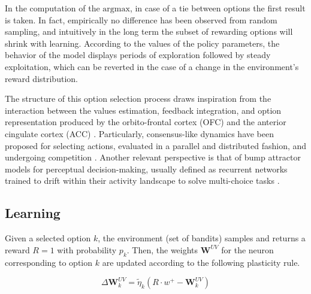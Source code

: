\noindent In the computation of the $\text{argmax}$, in case of a tie between options the first result is taken.
In fact, empirically no difference has been observed from random sampling, and intuitively in the long term the subset of rewarding options will shrink with learning.
According to the values of the policy parameters, the behavior of the model displays periods of exploration followed by steady exploitation, which can be reverted in the case of a change in the environment's reward distribution.

The structure of this option selection process draws inspiration from the interaction between the values estimation, feedback integration, and option representation produced by the orbito-frontal cortex (OFC) and the anterior cingulate cortex (ACC) \cite{kennerleyDecisionMakingReward2011, lukChoiceCodingFrontal2013, rollsEmotionMotivationDecisionmaking2023}.
Particularly, consensus-like dynamics have been proposed for selecting actions, evaluated in a parallel and distributed fashion, and undergoing competition \cite{cisekNeuralMechanismsInteracting2010, cisekMakingDecisionsDistributed2012, suzukiNeuralMechanismsUnderlying2015}.
Another relevant perspective is that of bump attractor models for perceptual decision-making, usually defined as recurrent networks trained to drift within their activity landscape to solve multi-choice tasks \cite{youDynamicsMultipleChoiceDecision2013, carrollEncodingCertaintyBump2014, esnaola-acebesBumpAttractorDynamics2021}.


\subsection{Learning}
Given a selected option $k$, the environment (set of bandits) samples and returns a reward $R=1$ with probability $p_{k}$.
Then, the weights $\textbf{W}^{UV}$ for the neuron corresponding to option $k$ are updated according to the following plasticity rule.

\begin{equation}
    \Delta \textbf{W}^{UV}_{k} = \tilde{\eta}_{k} \left(R\cdot w^{+}- \textbf{W}^{UV}_{k}\right)
\end{equation}

